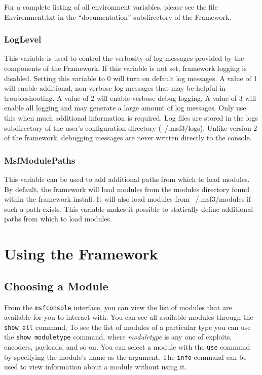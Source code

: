 \documentclass{report}
\begin{document}
\par
For a complete listing of all environment variables, please see the file
Environment.txt in the ``documentation'' subdirectory of the Framework. 

	\subsection{LogLevel}
\par
This variable is used to control the verbosity of log messages provided
by the components of the Framework.  If this variable is not set, framework
logging is disabled.  Setting this variable to 0 will turn on default log
messages.  A value of 1 will enable additional, non-verbose log messages that
may be helpful in troubleshooting.  A value of 2 will enable verbose debug
logging.  A value of 3 will enable all logging and may generate a large amount
of log messages.  Only use this when much additional information is required.
Log files are stored in the logs subdirectory of the user's configuration
directory (~/.msf3/logs). Unlike version 2 of the framework, debugging
messages are never written directly to the console.

	\subsection{MsfModulePaths}
\par
This variable can be used to add additional paths from which to load modules.
By default, the framework will load modules from the modules directory found
within the framework install.  It will also load modules from ~/.msf3/modules
if such a path exists.  This variable makes it possible to statically define
additional paths from which to load modules.

\pagebreak

\chapter{Using the Framework}

	\section{Choosing a Module}
\par
From the \texttt{msfconsole} interface, you can view the list of modules that
are available for you to interact with.  You can see all available modules
through the \texttt{show all} command.  To see the list of modules of a
particular type you can use the \texttt{show moduletype} command, where
\textit{moduletype} is any one of exploits, encoders, payloads, and so on.  
You can select a module with the \texttt{use} command by specifying the
module's name as the argument.  The \texttt{info} command can be used to view
information about a module without using it.
\end{document}
